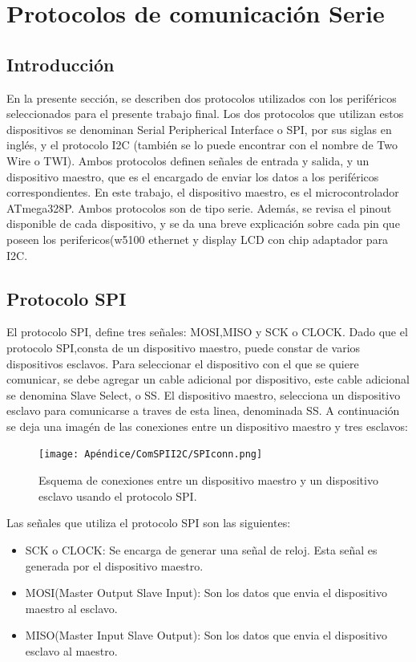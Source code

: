 \renewcommand{\chaptername}{Protocolos de comunicación Serie}
\chapter{Protocolos de comunicación Serie}\label{AP:protSerial}
\section{Introducción}
En la presente sección, se describen dos protocolos utilizados con los periféricos seleccionados para el presente trabajo final. Los dos protocolos que utilizan estos dispositivos se denominan Serial Peripherical Interface o SPI, por sus siglas en inglés, y el protocolo I2C (también se lo puede encontrar con el nombre de Two Wire o TWI). Ambos protocolos definen señales de entrada y salida, y un dispositivo maestro, que es el encargado de enviar los datos a los periféricos correspondientes. En este trabajo, el dispositivo maestro, es el microcontrolador ATmega328P. Ambos protocolos son de tipo serie. Además, se revisa el pinout disponible de cada dispositivo, y se da una breve explicación sobre cada pin que poseen los perifericos(w5100 ethernet y display LCD con chip adaptador para I2C. 


\section{Protocolo SPI}

El protocolo SPI, define tres señales: MOSI,MISO y SCK o CLOCK. Dado que el protocolo SPI,consta de un dispositivo maestro, puede constar de varios dispositivos esclavos. Para seleccionar el dispositivo con el que se quiere comunicar, se debe agregar un cable adicional por dispositivo, este cable adicional se denomina Slave Select, o SS. El dispositivo maestro, selecciona un dispositivo esclavo para comunicarse a traves de esta linea, denominada SS. A continuación se deja una imagén de las conexiones entre un dispositivo maestro y tres esclavos: 

\begin{figure}[H]
	\centering	
	\texttt{[image: Apéndice/ComSPII2C/SPIconn.png]}
	\caption{Esquema de conexiones entre un dispositivo maestro y un dispositivo esclavo usando el protocolo SPI.}
	\label{fig:master_slave_SPI}
\end{figure}

Las señales que utiliza el protocolo SPI son las siguientes: 
\begin{itemize}
	\item SCK o CLOCK: Se encarga de generar una señal de reloj. Esta señal es generada por el dispositivo maestro.
	\item MOSI(Master Output Slave Input): Son los datos que envia el dispositivo maestro al esclavo. 
	\item MISO(Master Input Slave Output): Son los datos que envia el dispositivo esclavo al maestro. 
\end{itemize}

